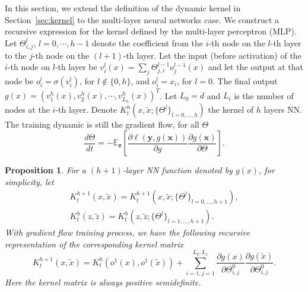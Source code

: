 \documentclass[11pt]{article}
\numberwithin{equation}{section}
\newtheorem{proposition}{Proposition}[section]
\def\bd#1{\mathbf{#1}}
\def\bx{\bd{x}}
\def\by{\bd{y}}
\begin{document}
In this section, we extend the definition of the dynamic kernel in Section~\ref{sec:kernel} to the multi-layer neural networks case. 
We construct a recursive expression for the kernel defined by the multi-layer perceptron (MLP). Let $\Theta_{i,j}^{l}$, $l=0,\cdots, h-1$ denote the coefficient from the $i$-th node on the $l$-th layer to the $j$-th node on the $(l+1)$-th layer. Let the input (before activation) of the $i$-th node on $l$-th layer be $v_i^l(x) = \sum_{j}\Theta^{l-1}_{j,i}o^{l-1}_j(x)$ and let the output at that node be $o_i^l=\sigma(v_i^l)$, for $ l \notin\{0,h\}$, and $o_i^l = x_i$, for $l=0$. The final output $g(x) = (v^h_1(x),v^h_2(x),\cdots, v^h_{L_h}(x))^T$. Let $L_0 = d$ and $L_i$ is the number of nodes at the $i$-th layer. Denote $K_t^{h}(x,\tilde x;\{\Theta^{l}\}_{l=0,\dots,h})$ the kernel of $h$ layers NN. The training dynamic is still the gradient flow, for all $\Theta$
\[
	\frac{d\Theta}{dt} =- \mathbb{E}_{\bd{z}}\left[\frac{\partial\ell(\by,g(\bx))}{\partial g}\frac{\partial g(\bx)}{\partial \Theta}\right].
\]
\begin{proposition}
	\label{prop:mlp}
For a $(h+1)$-layer NN function denoted by $g(x)$, for simplicity, let 
\begin{align}
	K_t^{h+1}(x, \tilde x) = K_t^{h+1}(x,\tilde x;\{\Theta^{l}\}_{l=0,\dots,h+1}), \\
	K_t^h(z,\tilde z) = K_t^{h}(z,\tilde z;\{\Theta^{l}\}_{l=1,\dots,h+1}).
\end{align}
With gradient flow training process, we have the following recursive representation of the corresponding kernel matrix
\[K_t^{h+1}(x, \tilde x) = K_t^{h}(o^1(x),o^1(\tilde x))  +  \sum_{i=1,j=1}^{L_0,L_1}\frac{\partial g(x)}{\partial \Theta^0_{i,j}}\frac{\partial g(\tilde  x)}{\partial \Theta^0_{i,j}}. \]
Here the kernel matrix is always positive semidefinite.
\end{proposition}
\end{document}
